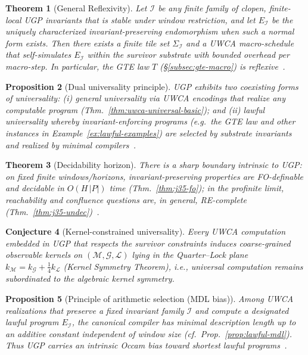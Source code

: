 \documentclass[12pt]{article}
\newtheorem{theorem}{Theorem}[section]
\newtheorem{proposition}[theorem]{Proposition}
\newtheorem{conjecture}[theorem]{Conjecture}
\numberwithin{equation}{section}
\newcommand{\M}{\mathcal{M}}
\newcommand{\G}{\mathcal{G}}
\newcommand{\LL}{\mathcal{L}}
\begin{document}
\begin{theorem}[General Reflexivity]\label{thm:general-reflexivity}
Let $\mathcal{I}$ be any finite family of clopen, finite-local UGP invariants that is stable under window restriction, and let $E_{\mathcal{I}}$ be the uniquely characterized invariant-preserving endomorphism when such a normal form exists. Then there exists a finite tile set $\Sigma_{\mathcal{I}}$ and a UWCA macro-schedule that \emph{self-simulates} $E_{\mathcal{I}}$ within the survivor substrate with bounded overhead per macro-step. In particular, the GTE law $T$ (\S\ref{subsec:gte-macro}) is reflexive~\cite{SpivackUGPFormalization,ugp-lean}.
\end{theorem}

\begin{proposition}[Dual universality principle]\label{prop:dual-universality}
UGP exhibits two coexisting forms of universality: (i) \emph{general universality} via UWCA encodings that realize any computable program (Thm.~\ref{thm:uwca-universal-basic}); and (ii) \emph{lawful universality} whereby invariant-enforcing programs (e.g.\ the GTE law and other instances in Example~\ref{ex:lawful-examples}) are selected by substrate invariants and realized by minimal compilers~\cite{SpivackUGPFormalization,ugp-lean}.
\end{proposition}

\begin{theorem}[Decidability horizon]\label{thm:decidability-horizon}
There is a sharp boundary intrinsic to UGP: on fixed finite windows/horizons, invariant-preserving properties are FO-definable and decidable in $O(H\,|P|)$ time (Thm.~\ref{thm:j35-fo}); in the profinite limit, reachability and confluence questions are, in general, RE-complete (Thm.~\ref{thm:j35-undec})~\cite{SpivackUGPFormalization,ugp-lean}.
\end{theorem}

\begin{conjecture}[Kernel-constrained universality]\label{conj:kernel-constrained}
Every UWCA computation embedded in UGP that respects the survivor constraints induces coarse-grained observable kernels on $(\M,\G,\LL)$ lying in the Quarter--Lock plane $k_{\M}=k_{\G}+\tfrac14 k_{\LL}$ (Kernel Symmetry Theorem), i.e., universal computation remains subordinated to the algebraic kernel symmetry.
\end{conjecture}

\begin{proposition}[Principle of arithmetic selection (MDL bias)]\label{prop:principle-mdl}
Among UWCA realizations that preserve a fixed invariant family $\mathcal{I}$ and compute a designated lawful program $E_{\mathcal{I}}$, the canonical compiler has minimal description length up to an additive constant independent of window size (cf.\ Prop.~\ref{prop:lawful-mdl}). Thus UGP carries an intrinsic Occam bias toward shortest lawful programs~\cite{SpivackUGPFormalization,ugp-lean}.
\end{proposition}
\end{document}

